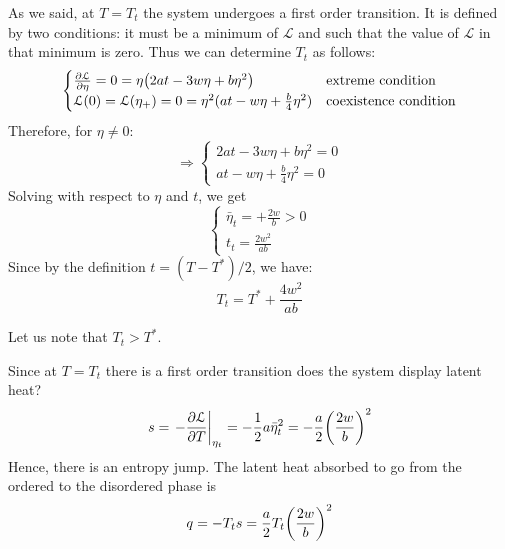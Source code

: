 \documentclass[../main/main.tex]{subfiles}
\begin{document}
  As we said, at \( T=T_t \) the system undergoes a first order transition. It is defined by two conditions: it must be a minimum of \( \mathcal{L} \) and such that the value of \( \mathcal{L} \) in that minimum is zero.  Thus we can determine \( T_t \) as follows:
  \begin{equation*}
    \begin{cases}
     \pdv{\mathcal{L}}{\eta } = 0 = \eta \qty(2 a t - 3 w \eta +  b \eta ^2)  & \text{extreme condition}\\
    \mathcal{L} ( 0 ) = \mathcal{L} ( \eta _+)=0 = \eta ^2 (a t - w \eta + \frac{b}{4} \eta ^2)& \text{coexistence condition}
    \end{cases}
  \end{equation*}
  Therefore, for \( \eta \neq 0 \):
  \begin{equation*}
  \Rightarrow
    \begin{cases}
     2 a t - 3 w \eta +  b \eta ^2 = 0\\
     a t - w \eta + \frac{b}{4} \eta ^2 = 0
    \end{cases}
  \end{equation*}
  Solving with respect to \( \eta  \)  and \( t \), we get
  \begin{equation*}
    \begin{cases}
     \bar{\eta }_{t} = + \frac{2w}{b} >0 \\
      t_t = \frac{2w^2}{ab}
    \end{cases}
  \end{equation*}
Since by the definition \( t = (T-T^*)/2 \), we have:
  \begin{equation}
    T_t = T^* + \frac{4w^2}{ab}
    \label{eq:16_6}
  \end{equation}
  \begin{remark}
  Let us note that \( T_t >T^* \).
  \end{remark}
  Since at \( T= T_t \) there is a first order transition does the system display latent heat?
  \begin{equation*}
    s = \eval{- \pdv{\mathcal{L}}{T} }_{\eta _t} = - \frac{1}{2} a \bar{\eta }_t^2 = - \frac{a}{2} \qty(\frac{2w}{b})^2
  \end{equation*}
  Hence, there is an entropy jump.
  The latent heat absorbed to go from the ordered to the disordered phase is
  \begin{equation}
    q = - T_t s = \frac{a}{2} T_t \qty(\frac{2w}{b})^2
  \end{equation}
\end{document}
